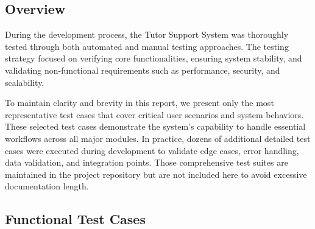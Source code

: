 
\subsection{Overview}

During the development process, the Tutor Support System was thoroughly tested through both automated and manual testing approaches. The testing strategy focused on verifying core functionalities, ensuring system stability, and validating non-functional requirements such as performance, security, and scalability.

To maintain clarity and brevity in this report, we present only the most representative test cases that cover critical user scenarios and system behaviors. These selected test cases demonstrate the system's capability to handle essential workflows across all major modules. In practice, dozens of additional detailed test cases were executed during development to validate edge cases, error handling, data validation, and integration points. Those comprehensive test suites are maintained in the project repository but are not included here to avoid excessive documentation length.

\subsection{Functional Test Cases}

\renewcommand{\arraystretch}{1.2}

